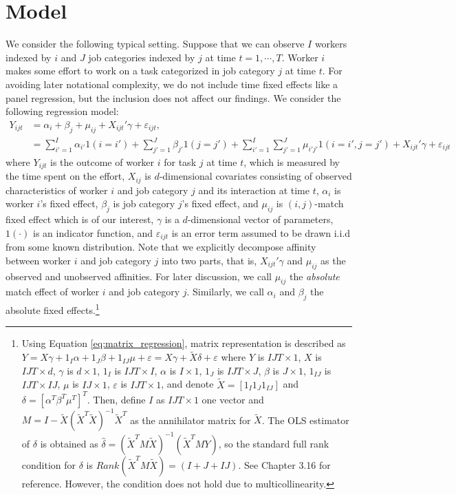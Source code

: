 \documentclass[12pt]{article}
\begin{document}
\section{Model}
We consider the following typical setting.
Suppose that we can observe $I$ workers indexed by $i$ and $J$ job categories indexed by $j$ at time $t=1,\cdots,T$.
Worker $i$ makes some effort to work on a task categorized in job category $j$ at time $t$.
For avoiding later notational complexity, we do not include time fixed effects like a panel regression, but the inclusion does not affect our findings.
We consider the following regression model:
\begin{align}
Y_{ijt}&=\alpha_{i}+\beta_{j}+\mu_{ij}+ X_{ijt}'\gamma+\varepsilon_{ijt}, \label{eq:orignal_regression}\\
&=\sum_{i'=1}^{I}\alpha_{i'}1(i=i')+\sum_{j'=1}^{J}\beta_{j'}1(j=j')+\sum_{i'=1}^{I}\sum_{j'=1}^{J}\mu_{i'j'}1(i=i',j=j')+ X_{ijt}'\gamma+\varepsilon_{ijt}\label{eq:matrix_regression}
\end{align}
where $Y_{ijt}$ is the outcome of worker $i$ for task $j$ at time $t$, which is measured by the time spent on the effort, $X_{ij}$ is $d$-dimensional covariates consisting of observed characteristics of worker $i$ and job category $j$ and its interaction at time $t$, $\alpha_{i}$ is worker $i$'s fixed effect, $\beta_{j}$ is job category $j$'s fixed effect, and $\mu_{ij}$ is $(i,j)$-match fixed effect which is of our interest, $\gamma$ is a $d$-dimensional vector of parameters, $1(\cdot)$ is an indicator function, and $\varepsilon_{ijt}$ is an error term assumed to be drawn i.i.d from some known distribution. 
Note that we explicitly decompose affinity between worker $i$ and job category $j$ into two parts, that is, $X_{ijt}'\gamma$ and $\mu_{ij}$ as the observed and unobserved affinities.
For later discussion, we call $\mu_{ij}$ the \textit{absolute} match effect of worker $i$ and job category $j$. Similarly, we call $\alpha_{i}$ and $\beta_{j}$ the absolute fixed effects.\footnote{Using Equation \eqref{eq:matrix_regression}, matrix representation is described as $Y=X\gamma+1_{I}\alpha+1_{J}\beta+1_{IJ}\mu+\varepsilon=X\gamma+\tilde{X}\delta + \varepsilon$
where $Y$ is $IJT\times 1$, $X$ is $IJT\times d$, $\gamma$ is $d\times 1$, $1_{I}$ is $IJT\times I$, $\alpha$ is $I\times 1$, $1_{J}$ is $IJT\times J$, $\beta$ is $J\times 1$, $1_{IJ}$ is $IJT\times IJ$, $\mu$ is $IJ\times 1$, $\varepsilon$ is $IJT\times 1$, and denote $\tilde{X}=[1_{I} 1_{J} 1_{IJ}]$ and $\delta=[\alpha^T \beta^T \mu^T]^T$. Then, define $I$ as $IJT\times 1$ one vector and $M=I-\tilde{X}(\tilde{X}^T\tilde{X})^{-1}\tilde{X}^{T}$ as the annihilator matrix for $\tilde{X}$. The OLS estimator of $\delta$ is obtained as $\hat{\delta}=(\tilde{X}^T M\tilde{X})^{-1}(\tilde{X}^T MY)$, so the standard full rank condition for $\delta$ is $Rank(\tilde{X}^T M\tilde{X})=(I+J+IJ)$. See \cite{hansen2022econometrics} Chapter 3.16 for reference. However, the condition does not hold due to multicollinearity.}
\end{document}
